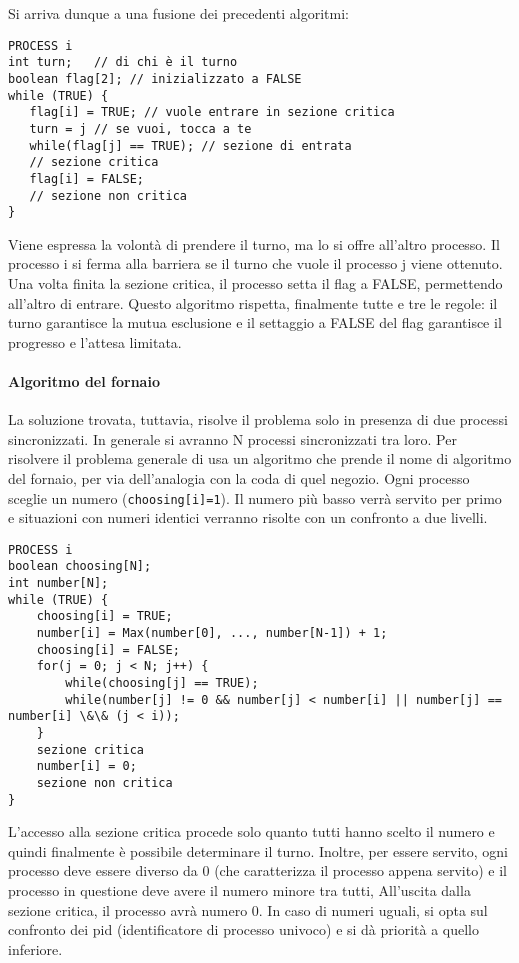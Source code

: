 \documentclass[a4paper]{article}
\begin{document}
Si arriva dunque a una fusione dei precedenti algoritmi:
\begin{verbatim}
PROCESS i
int turn;   // di chi è il turno
boolean flag[2]; // inizializzato a FALSE
while (TRUE) {
   flag[i] = TRUE; // vuole entrare in sezione critica
   turn = j // se vuoi, tocca a te
   while(flag[j] == TRUE); // sezione di entrata
   // sezione critica
   flag[i] = FALSE;
   // sezione non critica
}
\end{verbatim}
Viene espressa la volontà di prendere il turno, ma lo si offre all'altro processo. Il processo i si ferma alla barriera se il turno che vuole il processo j viene ottenuto. Una volta finita la sezione critica, il processo setta il flag a FALSE, permettendo all'altro di entrare. Questo algoritmo rispetta, finalmente tutte e tre le regole: il turno garantisce la mutua esclusione e il settaggio a FALSE del flag garantisce il progresso e l'attesa limitata.

\paragraph{Algoritmo del fornaio}
La soluzione trovata, tuttavia, risolve il problema solo in presenza di due processi sincronizzati. In generale si avranno N processi sincronizzati tra loro. Per risolvere il problema generale di usa un algoritmo che prende il nome di algoritmo del fornaio, per via dell'analogia con la coda di quel negozio. Ogni processo sceglie un numero (\texttt{choosing[i]=1}). Il numero più basso verrà servito per primo e situazioni con numeri identici verranno risolte con un confronto a due livelli.

\begin{verbatim}
PROCESS i
boolean choosing[N];
int number[N];
while (TRUE) {
    choosing[i] = TRUE;
    number[i] = Max(number[0], ..., number[N-1]) + 1;
    choosing[i] = FALSE;
    for(j = 0; j < N; j++) {
        while(choosing[j] == TRUE);
        while(number[j] != 0 && number[j] < number[i] || number[j] == number[i] \&\& (j < i));
    }
    sezione critica
    number[i] = 0;
    sezione non critica
}
\end{verbatim}
L'accesso alla sezione critica procede solo quanto tutti hanno scelto il numero e quindi finalmente è possibile determinare il turno. Inoltre, per essere servito, ogni processo deve essere diverso da 0 (che caratterizza il processo appena servito) e il processo in questione deve avere il numero minore tra tutti, All'uscita dalla sezione critica, il processo avrà numero 0. In caso di numeri uguali, si opta sul confronto dei pid (identificatore di processo univoco) e si dà priorità a quello inferiore.
\end{document}
